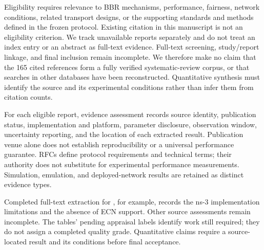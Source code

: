 \documentclass[a4paper,fleqn]{cas-sc}
\begin{document}
Eligibility requires relevance to BBR mechanisms, performance, fairness,
network conditions, related transport designs, or the supporting standards
and methods defined in the frozen protocol. Existing citation in this
manuscript is not an eligibility criterion. We track unavailable reports
separately and do not treat an index entry or an abstract as full-text evidence.
Full-text screening, study/report linkage, and final inclusion remain
incomplete. We therefore make no claim that the 165 cited references form
a fully verified systematic-review corpus, or that searches in other databases
have been reconstructed. Quantitative synthesis must identify the source
and its experimental conditions rather than infer them from citation counts.

For each eligible report, evidence assessment records source identity,
publication status, implementation and platform, parameter disclosure,
observation window, uncertainty reporting, and the location of each extracted
result. Publication venue alone does not establish reproducibility or a
universal performance guarantee. RFCs define protocol requirements and
technical terms; their authority does not substitute for experimental
performance measurements. Simulation, emulation, and deployed-network
results are retained as distinct evidence types.

Completed full-text extraction for \citet{piotrowska2024}, for example,
records the ns-3 implementation limitations and the absence of ECN support.
Other source assessments remain incomplete. The tables' pending appraisal
labels identify work still required; they do not assign a completed quality
grade. Quantitative claims require a source-located result and its conditions
before final acceptance.
\end{document}
